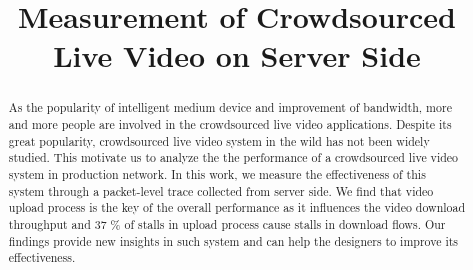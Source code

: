\documentclass{article}
\begin{document}
\title{Measurement of Crowdsourced Live Video on Server Side}

\author{}
\date{}
\maketitle

\begin{abstract}
As the popularity of intelligent medium device and improvement of bandwidth, more and more people are involved in the crowdsourced live video applications. Despite its great popularity, crowdsourced live video system in the wild has not been widely studied. This motivate us to analyze the the performance of a crowdsourced live video system in production network. In this work, we measure the effectiveness of this system through a packet-level trace collected from server side. We find that video upload process is the key of the overall performance as it influences the video download throughput and 37 \% of stalls in upload process cause stalls in download flows. Our findings provide new insights in such system and can help the designers to improve its effectiveness.
\end{abstract}



%


%





\end{document}
